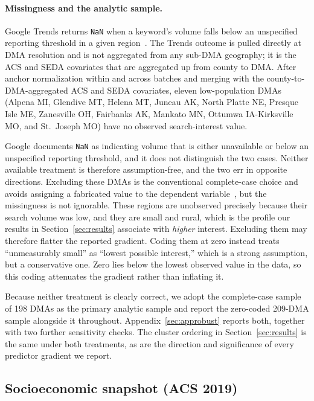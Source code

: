 \documentclass[11pt]{article}
\begin{document}
\paragraph{Missingness and the analytic sample.}
Google Trends returns \texttt{NaN} when a keyword's volume falls below an unspecified reporting threshold in a given region~\citep{googletrends}. The Trends outcome is pulled directly at DMA resolution and is not aggregated from any sub-DMA geography; it is the ACS and SEDA covariates that are aggregated up from county to DMA. After anchor normalization within and across batches and merging with the county-to-DMA-aggregated ACS and SEDA covariates, eleven low-population DMAs (Alpena MI, Glendive MT, Helena MT, Juneau AK, North Platte NE, Presque Isle ME, Zanesville OH, Fairbanks AK, Mankato MN, Ottumwa IA-Kirksville MO, and St.\ Joseph MO) have no observed search-interest value.

Google documents \texttt{NaN} as indicating volume that is either unavailable or below an unspecified reporting threshold, and it does not distinguish the two cases. Neither available treatment is therefore assumption-free, and the two err in opposite directions. Excluding these DMAs is the conventional complete-case choice and avoids assigning a fabricated value to the dependent variable~\citep{vonhippel2007}, but the missingness is not ignorable. These regions are unobserved precisely because their search volume was low, and they are small and rural, which is the profile our results in Section~\ref{sec:results} associate with \emph{higher} interest. Excluding them may therefore flatter the reported gradient. Coding them at zero instead treats ``unmeasurably small'' as ``lowest possible interest,'' which is a strong assumption, but a conservative one. Zero lies below the lowest observed value in the data, so this coding attenuates the gradient rather than inflating it.

Because neither treatment is clearly correct, we adopt the complete-case sample of 198 DMAs as the primary analytic sample and report the zero-coded 209-DMA sample alongside it throughout. Appendix~\ref{sec:approbust} reports both, together with two further sensitivity checks. The cluster ordering in Section~\ref{sec:results} is the same under both treatments, as are the direction and significance of every predictor gradient we report.

\subsection{Socioeconomic snapshot (ACS 2019)}
\end{document}
